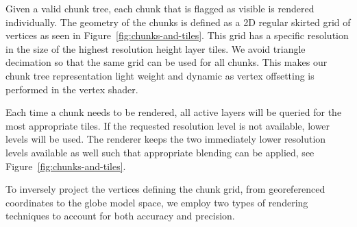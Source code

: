 \documentclass[journal]{vgtc}                %
\newcommand{\alexcomment}[1]{\textbf{[-Alex-~}
    \textcolor{magenta}{#1}
    \textbf{~]}}
\newcommand{\plgrem}[1]{\textcolor{blue}{~\textbf{!!}~}}
\newcommand{\fig}[1]{Figure~\ref{fig:#1}}
\begin{document}
Given a valid chunk tree, each chunk that is flagged as visible is rendered individually.
The geometry of the chunks is defined as a 2D regular skirted grid of vertices as seen in \fig{chunks-and-tiles}. This grid has a specific resolution in the size of the highest resolution height layer tiles. We avoid triangle decimation so that the same grid can be used for all chunks. This makes our chunk tree representation light weight and dynamic as vertex offsetting is performed in the vertex shader.

Each time a chunk needs to be rendered, all active layers will be queried for the most appropriate tiles.
If the requested resolution level is not available, lower levels will be used.
The renderer keeps the two immediately lower resolution levels available as well such that appropriate blending can be applied, see \fig{chunks-and-tiles}.



To inversely project the vertices defining the chunk grid, from georeferenced coordinates to the globe model space, we employ two types of rendering techniques to account for both accuracy and precision.
\end{document}
